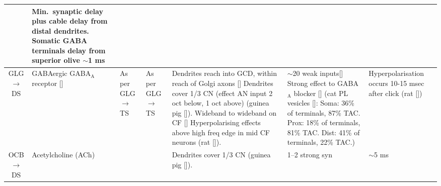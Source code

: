 \begin{longtable}{cYYYYYY}
& %
Min.\ synaptic delay plus cable delay from distal dendrites.
Somatic GABA terminals delay from superior olive $\sim$1 ms
\\ \midrule
GLG\ensuremath{\rightarrow}DS                         
& %
{GABAergic} {GABA$_{\textrm{A}}$} receptor []
& %
As per GLG\ensuremath{\rightarrow}TS
& %
As per GLG\ensuremath{\rightarrow}TS
& %
Dendrites reach into GCD, within reach of Golgi axons []     
Dendrites cover 1/3 CN (effect AN input 2 oct below, 1 oct above) (guinea pig []).
Wideband to wideband on CF [] 
Hyperpolarising effects above high freq edge in mid CF neurons (rat []).                    
& %
$\sim$20 weak inputs[]
Strong effect to {GABA$_{\textrm{A}}$} blocker  []
(cat PL vesicles []:
Soma: 36\% of terminals, 87\% TAC. 
Prox: 18\% of terminals, 81\% TAC. 
Dist: 41\% of terminals, 22\% TAC.)
& %
Hyperpolarisation occurs 10-15 msec after click (rat [])
\\ \midrule

OCB$\rightarrow$DS
& Acetylcholine (ACh)
& 
&
& Dendrites cover 1/3 CN (guinea pig []).
& 1--2 strong syn \citep{MuldersPaoliniEtAl:2009,HorvathKrausEtAl:2000,MuldersPaoliniEtAl:2003}
& $\sim$5 ms \citep{MuldersPaoliniEtAl:2009}\\
\end{longtable}





